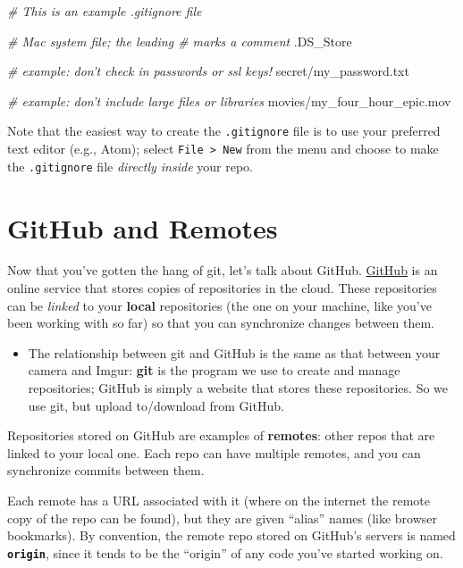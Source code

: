 \documentclass[]{book}
\newenvironment{Shaded}{\begin{snugshade}}{\end{snugshade}}
\newcommand{\CommentTok}[1]{\textcolor[rgb]{0.56,0.35,0.01}{\textit{#1}}}
\newcommand{\ExtensionTok}[1]{#1}
\providecommand{\tightlist}{%
  \setlength{\itemsep}{0pt}\setlength{\parskip}{0pt}}
\theoremstyle{definition}
\theoremstyle{definition}
\theoremstyle{remark}
\begin{document}
\begin{Shaded}
\begin{Highlighting}[]
\CommentTok{# This is an example .gitignore file}

\CommentTok{# Mac system file; the leading # marks a comment}
\ExtensionTok{.DS_Store}

\CommentTok{# example: don't check in passwords or ssl keys!}
\ExtensionTok{secret/my_password.txt}

\CommentTok{# example: don't include large files or libraries}
\ExtensionTok{movies/my_four_hour_epic.mov}
\end{Highlighting}
\end{Shaded}

Note that the easiest way to create the \texttt{.gitignore} file is to
use your preferred text editor (e.g., Atom); select
\texttt{File\ \textgreater{}\ New} from the menu and choose to make the
\texttt{.gitignore} file \emph{directly inside} your repo.

\section{GitHub and Remotes}\label{github-and-remotes}

Now that you've gotten the hang of git, let's talk about GitHub.
\href{https://github.com/}{GitHub} is an online service that stores
copies of repositories in the cloud. These repositories can be
\emph{linked} to your \textbf{local} repositories (the one on your
machine, like you've been working with so far) so that you can
synchronize changes between them.

\begin{itemize}
\tightlist
\item
  The relationship between git and GitHub is the same as that between
  your camera and Imgur: \textbf{git} is the program we use to create
  and manage repositories; GitHub is simply a website that stores these
  repositories. So we use git, but upload to/download from GitHub.
\end{itemize}

Repositories stored on GitHub are examples of \textbf{remotes}: other
repos that are linked to your local one. Each repo can have multiple
remotes, and you can synchronize commits between them.

Each remote has a URL associated with it (where on the internet the
remote copy of the repo can be found), but they are given ``alias''
names (like browser bookmarks). By convention, the remote repo stored on
GitHub's servers is named \textbf{\texttt{origin}}, since it tends to be
the ``origin'' of any code you've started working on.
\end{document}
